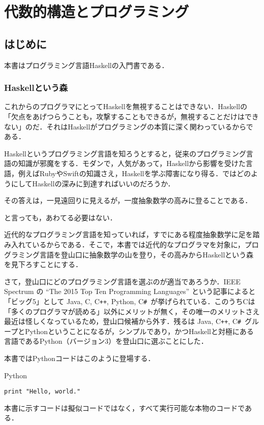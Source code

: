 \documentclass[a4paper,draft]{jsbook}
\newcommand{\programminglanguage}[1]{\textsf{#1}}
\newcommand{\clang}{\programminglanguage{C}}
\newcommand{\csharp}{\programminglanguage{C}\texttt{\#}}
\newcommand{\cxx}{\programminglanguage{C}\texttt{++}}
\newcommand{\haskell}{\programminglanguage{Haskell}}
\newcommand{\java}{\programminglanguage{Java}}
\newcommand{\python}{\programminglanguage{Python}}
\newcommand{\ruby}{\programminglanguage{Ruby}}
\newcommand{\swift}{\programminglanguage{Swift}}
\newenvironment{leader}{\begingroup}{\endgroup}
\newenvironment{pythoncode}{\begin{itembox}[r]{\python}}{\end{itembox}}
\begin{document}
\part{代数的構造とプログラミング}

\chapter{はじめに}

\begin{leader}
本書はプログラミング言語\haskell の入門書である．
\end{leader}

\section{\haskell という森}

これからのプログラマにとって\haskell を無視することはできない．\haskell の「欠点をあげつらうことも，攻撃することもできるが，無視することだけはできない」のだ．それは\haskell がプログラミングの本質に深く関わっているからである．

\haskell というプログラミング言語を知ろうとすると，従来のプログラミング言語の知識が邪魔をする．モダンで，人気があって，\haskell から影響を受けた言語，例えば\ruby や\swift の知識さえ，\haskell を学ぶ障害になり得る．ではどのようにして\haskell の深みに到達すればいいのだろうか．

その答えは，一見遠回りに見えるが，一度抽象数学の高みに登ることである．

と言っても，あわてる必要はない．

近代的なプログラミング言語を知っていれば，すでにある程度抽象数学に足を踏み入れているからである．そこで，本書では近代的なプログラマを対象に，プログラミング言語を登山口に抽象数学の山を登り，その高みから\haskell という森を見下ろすことにする．


さて，登山口にどのプログラミング言語を選ぶのが適当であろうか．IEEE Spectrum の ``The 2015 Top Ten Programming Languages'' という記事によると「ビッグ5」として \java, \clang, \cxx, \python, \csharp\ が挙げられている．このうち\clang は「多くのプログラマが読める」以外にメリットが無く，その唯一のメリットさえ最近は怪しくなっているため，登山口候補から外す．残るは \java, \cxx, \csharp\ グループと\python ということになるが，シンプルであり，かつ\haskell と対極にある言語である\python（バージョン3）を登山口に選ぶことにした．

本書では\python コードはこのように登場する．
\begin{pythoncode}
\begin{verbatim}
print "Hello, world."
\end{verbatim}
\end{pythoncode}
本書に示すコードは擬似コードではなく，すべて実行可能な本物のコードである．
\end{document}
